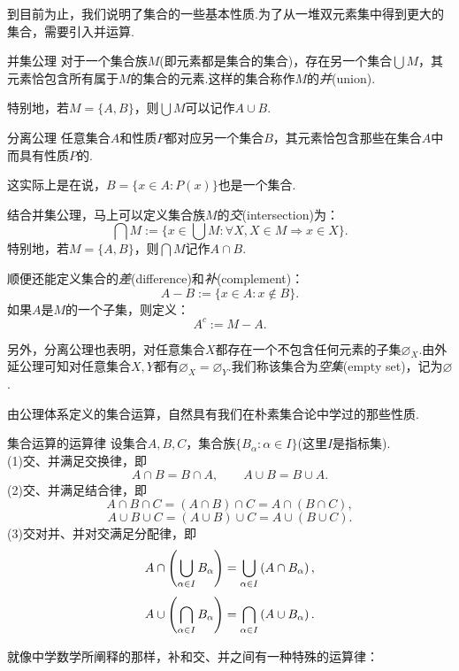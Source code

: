 到目前为止，我们说明了集合的一些基本性质.为了从一堆双元素集中得到更大的集合，需要引入并运算.

\begin{axiom}{并集公理}
	对于一个集合族$M$(即元素都是集合的集合)，存在另一个集合$\bigcup M$，其元素恰包含所有属于$M$的集合的元素.这样的集合称作$M$的\textit{并}(union).
\end{axiom}

特别地，若$M=\{ A,B \}$，则$\bigcup M$可以记作$A \cup B$.

\begin{axiom}{分离公理}
	任意集合$A$和性质$P$都对应另一个集合$B$，其元素恰包含那些在集合$A$中而具有性质$P$的.
\end{axiom}

这实际上是在说，$B=\{ x \in A : P(x) \}$也是一个集合.

结合并集公理，马上可以定义集合族$M$的\textit{交}(intersection)为：$$\bigcap M := \{ x \in \bigcup M : \forall X,X \in M \Rightarrow x \in X \}.$$
特别地，若$M= \{ A,B \}$，则$\bigcap M$记作$A \cap B$.

顺便还能定义集合的\textit{差}(difference)和\textit{补}(complement)：$$A - B := \{ x \in A : x \notin B \}.$$
如果$A$是$M$的一个子集，则定义：$$A^c := M - A.$$

另外，分离公理也表明，对任意集合$X$都存在一个不包含任何元素的子集$\varnothing _X$.由外延公理可知对任意集合$X,Y$都有$\varnothing _X = \varnothing _Y$.我们称该集合为\textit{空集}(empty set)，记为$\varnothing$.

由公理体系定义的集合运算，自然具有我们在朴素集合论中学过的那些性质.

\begin{proposition}{集合运算的运算律}
	设集合$A,B,C$，集合族$\{ B_{\alpha} : \alpha \in I \}$(这里$I$是指标集). \\
	(1)交、并满足交换律，即$$A \cap B = B \cap A, \qquad A \cup B = B \cup A.$$
	(2)交、并满足结合律，即
	$$A \cap B \cap C = (A \cap B) \cap C = A \cap (B \cap C),$$
	$$A \cup B \cup C = (A \cup B) \cup C = A \cup (B \cup C).$$
	(3)交对并、并对交满足分配律，即
	$$A \cap \left( \bigcup_{\alpha \in I} B_\alpha \right) = \bigcup_{\alpha \in I} \left( A \cap B_{\alpha} \right),$$
	$$A \cup \left( \bigcap_{\alpha \in I} B_\alpha \right) = \bigcap_{\alpha \in I} \left( A \cup B_{\alpha} \right).$$
\end{proposition}

就像中学数学所阐释的那样，补和交、并之间有一种特殊的运算律：

